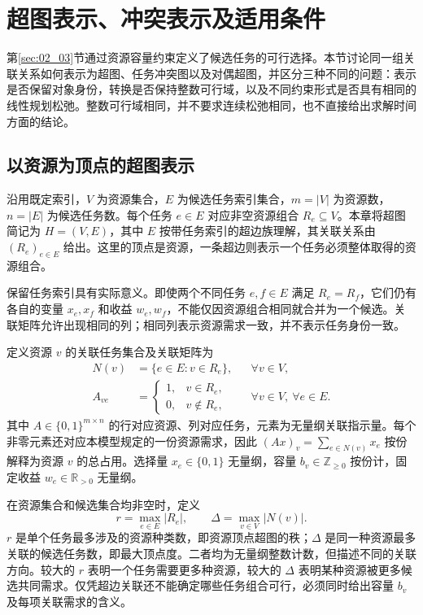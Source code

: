 \section{超图表示、冲突表示及适用条件}
\label{sec:02_04}

第\ref{sec:02_03}节通过资源容量约束定义了候选任务的可行选择。本节讨论同一组关联关系如何表示为超图、任务冲突图以及对偶超图，并区分三种不同的问题：表示是否保留对象身份，转换是否保持整数可行域，以及不同约束形式是否具有相同的线性规划松弛。整数可行域相同，并不要求连续松弛相同，也不直接给出求解时间方面的结论。

\subsection{以资源为顶点的超图表示}

沿用既定索引，$V$ 为资源集合，$E$ 为候选任务索引集合，$m=|V|$ 为资源数，$n=|E|$ 为候选任务数。每个任务 $e\in E$ 对应非空资源组合 $R_e\subseteq V$。本章将超图简记为 $H=(V,E)$，其中 $E$ 按带任务索引的超边族理解，其关联关系由 $(R_e)_{e\in E}$ 给出。这里的顶点是资源，一条超边则表示一个任务必须整体取得的资源组合。

保留任务索引具有实际意义。即使两个不同任务 $e,f\in E$ 满足 $R_e=R_f$，它们仍有各自的变量 $x_e,x_f$ 和收益 $w_e,w_f$，不能仅因资源组合相同就合并为一个候选。关联矩阵允许出现相同的列；相同列表示资源需求一致，并不表示任务身份一致。

定义资源 $v$ 的关联任务集合及关联矩阵为
\begin{align}
 N(v)&=\{e\in E:v\in R_e\},
 &&\forall v\in V,
 \label{s0204:neighborhood}\\
 A_{ve}&=\begin{cases}
 1,&v\in R_e,\\
 0,&v\notin R_e,
 \end{cases}
 &&\forall v\in V,\ \forall e\in E.
 \label{s0204:incidence}
\end{align}
其中 $A\in\{0,1\}^{m\times n}$ 的行对应资源、列对应任务，元素为无量纲关联指示量。每个非零元素还对应本模型规定的一份资源需求，因此 $(Ax)_v=\sum_{e\in N(v)}x_e$ 按份解释为资源 $v$ 的总占用。选择量 $x_e\in\{0,1\}$ 无量纲，容量 $b_v\in\mathbb Z_{\geq0}$ 按份计，固定收益 $w_e\in\mathbb R_{>0}$ 无量纲。

在资源集合和候选集合均非空时，定义
\begin{equation}
 r=\max_{e\in E}|R_e|,
 \qquad
 \Delta=\max_{v\in V}|N(v)|.
 \label{s0204:rank_degree}
\end{equation}
$r$ 是单个任务最多涉及的资源种类数，即资源顶点超图的秩；$\Delta$ 是同一种资源最多关联的候选任务数，即最大顶点度。二者均为无量纲整数计数，但描述不同的关联方向。较大的 $r$ 表明一个任务需要更多种资源，较大的 $\Delta$ 表明某种资源被更多候选共同需求。仅凭超边关联还不能确定哪些任务组合可行，必须同时给出容量 $b_v$ 及每项关联需求的含义。

